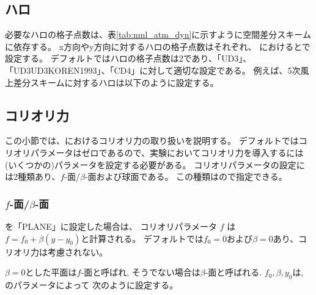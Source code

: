 \subsection{ハロ}

必要なハロの格子点数は、表\ref{tab:nml_atm_dyn}に示すように空間差分スキームに依存する。
x方向やy方向に対するハロの格子点数はそれぞれ、
におけるとで設定する。
デフォルトではハロの格子点数は2であり、「UD3」、「UD3UD3KOREN1993」、「CD4」に対して適切な設定である。
例えば、5次風上差分スキームに対するハロは以下のように設定する。


\subsection{コリオリ力} \label{subsec:coriolis}

この小節では、{\scalerm}におけるコリオリ力の取り扱いを説明する。
デフォルトではコリオリパラメータはゼロであるので、実験においてコリオリ力を導入するには
(いくつかの)パラメータを設定する必要がある。
コリオリパラメータの設定には2種類あり、$f$-面/$\beta$-面および球面である。
この種類はので指定できる。

\subsubsection{$f$-面/$\beta$-面}
を「PLANE」に設定した場合は、
コリオリパラメータ $f$ は $f=f_0 + \beta (y-y_0)$と計算される。
デフォルトでは$f_0=0$および$\beta=0$あり、コリオリ力は考慮されない。

$\beta=0$とした平面は$f$-面と呼ばれ, そうでない場合は$\beta$-面と呼ばれる.
$f_0, \beta, y_0$は, のパラメータによって
次のように設定する。

